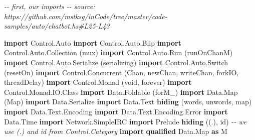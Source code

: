 \documentclass[]{article}
\newenvironment{Shaded}{}{}
\newcommand{\CommentTok}[1]{\textcolor[rgb]{0.38,0.63,0.69}{\textit{#1}}}
\newcommand{\DataTypeTok}[1]{\textcolor[rgb]{0.56,0.13,0.00}{#1}}
\newcommand{\KeywordTok}[1]{\textcolor[rgb]{0.00,0.44,0.13}{\textbf{#1}}}
\newcommand{\NormalTok}[1]{#1}
\begin{document}
\begin{Shaded}
\begin{Highlighting}[]
\CommentTok{{-}{-} first, our imports}
\CommentTok{{-}{-} source: https://github.com/mstksg/inCode/tree/master/code{-}samples/auto/chatbot.hs\#L25{-}L43}

\KeywordTok{import} \DataTypeTok{Control.Auto}
\KeywordTok{import} \DataTypeTok{Control.Auto.Blip}
\KeywordTok{import} \DataTypeTok{Control.Auto.Collection}\NormalTok{  (mux)}
\KeywordTok{import} \DataTypeTok{Control.Auto.Run}\NormalTok{         (runOnChanM)}
\KeywordTok{import} \DataTypeTok{Control.Auto.Serialize}\NormalTok{   (serializing\textquotesingle{})}
\KeywordTok{import} \DataTypeTok{Control.Auto.Switch}\NormalTok{      (resetOn)}
\KeywordTok{import} \DataTypeTok{Control.Concurrent}\NormalTok{       (}\DataTypeTok{Chan}\NormalTok{, newChan, writeChan, forkIO, threadDelay)}
\KeywordTok{import} \DataTypeTok{Control.Monad}\NormalTok{            (void, forever)}
\KeywordTok{import} \DataTypeTok{Control.Monad.IO.Class}
\KeywordTok{import} \DataTypeTok{Data.Foldable}\NormalTok{            (forM\_)}
\KeywordTok{import} \DataTypeTok{Data.Map}\NormalTok{                 (}\DataTypeTok{Map}\NormalTok{)}
\KeywordTok{import} \DataTypeTok{Data.Serialize}
\KeywordTok{import} \DataTypeTok{Data.Text} \KeywordTok{hiding}\NormalTok{         (words, unwords, map)}
\KeywordTok{import} \DataTypeTok{Data.Text.Encoding}
\KeywordTok{import} \DataTypeTok{Data.Text.Encoding.Error}
\KeywordTok{import} \DataTypeTok{Data.Time}
\KeywordTok{import} \DataTypeTok{Network.SimpleIRC}
\KeywordTok{import} \DataTypeTok{Prelude} \KeywordTok{hiding}\NormalTok{           ((.), id)   }\CommentTok{{-}{-} we use (.) and id from \textasciigrave{}Control.Category\textasciigrave{}}
\KeywordTok{import} \KeywordTok{qualified} \DataTypeTok{Data.Map}       \KeywordTok{as} \DataTypeTok{M}
\end{Highlighting}
\end{Shaded}
\end{document}

